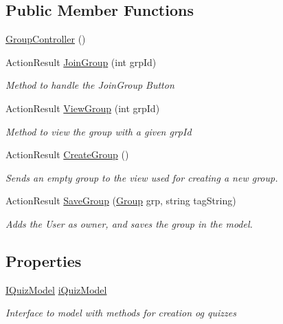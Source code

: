 \subsection*{Public Member Functions}
\begin{DoxyCompactItemize}
\item 
\hyperlink{class_website_1_1_controllers_1_1_group_controller_a92bc4466c5fb4254dc762e593bfe194d}{Group\+Controller} ()
\item 
Action\+Result \hyperlink{class_website_1_1_controllers_1_1_group_controller_a9d4ac2f3d61ab6f741cc2520688a20ea}{Join\+Group} (int grp\+Id)
\begin{DoxyCompactList}\small\item\em Method to handle the Join\+Group Button \end{DoxyCompactList}\item 
Action\+Result \hyperlink{class_website_1_1_controllers_1_1_group_controller_a04a0523a86f0b656401cc867d9df53d2}{View\+Group} (int grp\+Id)
\begin{DoxyCompactList}\small\item\em Method to view the group with a given grp\+Id \end{DoxyCompactList}\item 
Action\+Result \hyperlink{class_website_1_1_controllers_1_1_group_controller_a7df28fe4039208f948d71deaf217f5b8}{Create\+Group} ()
\begin{DoxyCompactList}\small\item\em Sends an empty group to the view used for creating a new group. \end{DoxyCompactList}\item 
Action\+Result \hyperlink{class_website_1_1_controllers_1_1_group_controller_a00fb88c51b6fd9af76dacdc821f6ae11}{Save\+Group} (\hyperlink{class_website_1_1_models_1_1_group}{Group} grp, string tag\+String)
\begin{DoxyCompactList}\small\item\em Adds the User as owner, and saves the group in the model. \end{DoxyCompactList}\end{DoxyCompactItemize}
\subsection*{Properties}
\begin{DoxyCompactItemize}
\item 
\hyperlink{interface_website_1_1_controllers_1_1_i_quiz_model}{I\+Quiz\+Model} \hyperlink{class_website_1_1_controllers_1_1_group_controller_a0df206ca548f0760256dd5ccb053f42d}{i\+Quiz\+Model}
\begin{DoxyCompactList}\small\item\em Interface to model with methods for creation og quizzes \end{DoxyCompactList}\end{DoxyCompactItemize}


